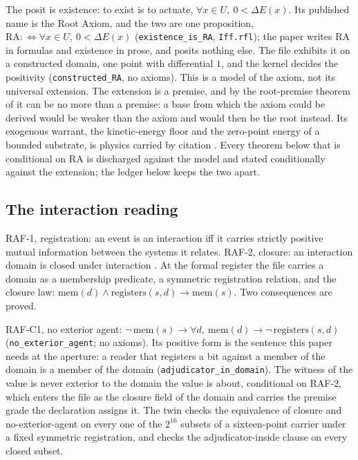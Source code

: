 \documentclass[10pt,twocolumn]{article}
\begin{document}
The posit is existence: to exist is to actuate,
\(\forall x \in U,\ 0 < \Delta E(x)\). Its published name is the Root
Axiom, and the two are one proposition,
\(\mathrm{RA} :\Leftrightarrow \forall x \in U,\ 0 < \Delta E(x)\)
(\texttt{existence\_\allowbreak is\_\allowbreak RA}, \texttt{Iff.rfl});
the paper writes \(\mathrm{RA}\) in formulas and existence in prose, and
posits nothing else. The file exhibits it on a constructed domain, one
point with differential \(1\), and the kernel decides the positivity
(\texttt{constructed\_\allowbreak RA}, no axioms). This is a model of
the axiom, not its universal extension. The extension is a premise, and
by the root-premise theorem of \cite{islamcodex} it can be no more than
a premise: a base from which the axiom could be derived would be weaker
than the axiom and would then be the root instead. Its exogenous
warrant, the kinetic-energy floor and the zero-point energy of a bounded
substrate, is physics carried by citation \cite{islamcodex}. Every
theorem below that is conditional on \(\mathrm{RA}\) is discharged
against the model and stated conditionally against the extension; the
ledger below keeps the two apart.

\hypertarget{the-interaction-reading}{%
\subsection{The interaction reading}\label{the-interaction-reading}}

RAF-1, registration: an event is an interaction iff it carries strictly
positive mutual information between the systems it relates. RAF-2,
closure: an interaction domain is closed under interaction
\cite{islamraf}. At the formal register the file carries a domain as a
membership predicate, a symmetric registration relation, and the closure
law:
\(\mathrm{mem}(d) \wedge \mathrm{registers}(s, d) \to \mathrm{mem}(s)\).
Two consequences are proved.

RAF-C1, no exterior agent:
\(\neg\,\mathrm{mem}(s) \to \forall d,\ \mathrm{mem}(d) \to \neg\,\mathrm{registers}(s, d)\)
(\texttt{no\_\allowbreak exterior\_\allowbreak agent}; no axioms). Its
positive form is the sentence this paper needs at the aperture: a reader
that registers a bit against a member of the domain is a member of the
domain (\texttt{adjudicator\_\allowbreak in\_\allowbreak domain}). The
witness of the value is never exterior to the domain the value is about,
conditional on RAF-2, which enters the file as the closure field of the
domain and carries the premise grade the declaration assigns it. The
twin checks the equivalence of closure and no-exterior-agent on every
one of the \(2^{16}\) subsets of a sixteen-point carrier under a fixed
symmetric registration, and checks the adjudicator-inside clause on
every closed subset.
\end{document}
